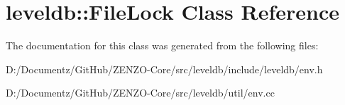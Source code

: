 \hypertarget{classleveldb_1_1_file_lock}{}\section{leveldb\+::File\+Lock Class Reference}
\label{classleveldb_1_1_file_lock}


The documentation for this class was generated from the following files\+:\begin{DoxyCompactItemize}
\item 
D\+:/\+Documentz/\+Git\+Hub/\+Z\+E\+N\+Z\+O-\/\+Core/src/leveldb/include/leveldb/env.\+h\item 
D\+:/\+Documentz/\+Git\+Hub/\+Z\+E\+N\+Z\+O-\/\+Core/src/leveldb/util/env.\+cc\end{DoxyCompactItemize}
